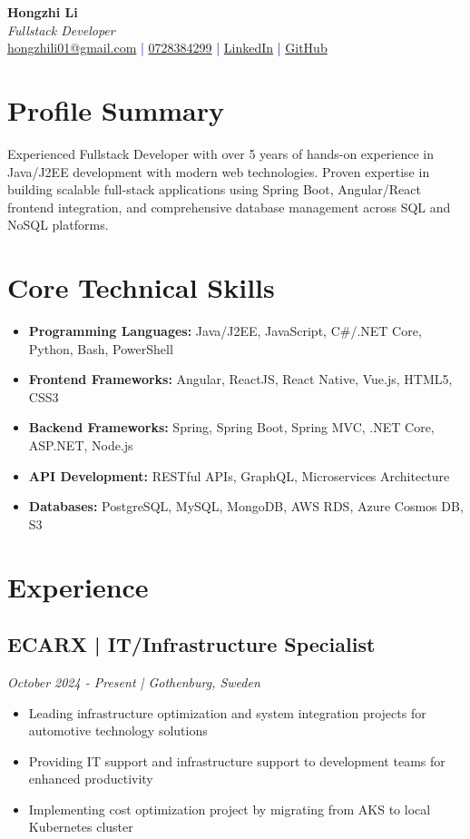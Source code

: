 \documentclass[11pt,a4paper]{article}
\begin{document}
\pagestyle{empty} %

\begin{center}
{\LARGE \textbf{Hongzhi Li}}\\[10pt]
{\Large \textit{Fullstack Developer}}\\[10pt]
\textcolor{darkblue}{\href{mailto:hongzhili01@google.com}{hongzhili01@gmail.com} | \href{tel:0728384299}{0728384299} | \href{https://www.linkedin.com/in/hzl/}{LinkedIn} | \href{https://github.com/bluehawana}{GitHub}}
\end{center}

\section*{Profile Summary}
Experienced Fullstack Developer with over 5 years of hands-on experience in Java/J2EE development with modern web technologies. Proven expertise in building scalable full-stack applications using Spring Boot, Angular/React frontend integration, and comprehensive database management across SQL and NoSQL platforms.

\section*{Core Technical Skills}
\begin{itemize}[noitemsep]
\item \textbf{Programming Languages:} Java/J2EE, JavaScript, C\#/.NET Core, Python, Bash, PowerShell
\item \textbf{Frontend Frameworks:} Angular, ReactJS, React Native, Vue.js, HTML5, CSS3
\item \textbf{Backend Frameworks:} Spring, Spring Boot, Spring MVC, .NET Core, ASP.NET, Node.js
\item \textbf{API Development:} RESTful APIs, GraphQL, Microservices Architecture
\item \textbf{Databases:} PostgreSQL, MySQL, MongoDB, AWS RDS, Azure Cosmos DB, S3
\end{itemize}

\section*{Experience}
\subsection*{ECARX | IT/Infrastructure Specialist}
\textit{October 2024 - Present | Gothenburg, Sweden}
\begin{itemize}[noitemsep]
\item Leading infrastructure optimization and system integration projects for automotive technology solutions
\item Providing IT support and infrastructure support to development teams for enhanced productivity
\item Implementing cost optimization project by migrating from AKS to local Kubernetes cluster
\end{itemize}
\end{document}
